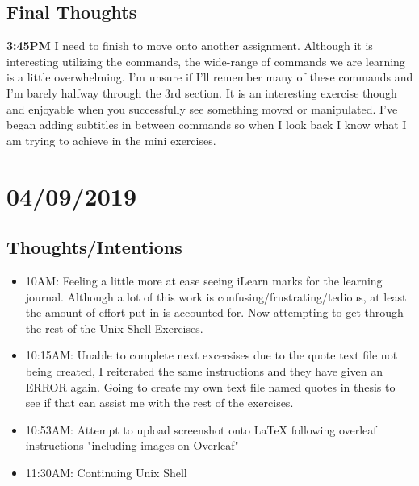 \documentclass{article}
\begin{document}
\subsection{Final Thoughts}
\textbf{3:45PM} I need to finish to move onto another assignment. Although it is interesting utilizing the commands, the wide-range of commands we are learning is a little overwhelming. I'm unsure if I'll remember many of these commands and I'm barely halfway through the 3rd section. It is an interesting exercise though and enjoyable when you successfully see something moved or manipulated. I've began adding subtitles in between commands so when I look back I know what I am trying to achieve in the mini exercises.

\section{04/09/2019}
\subsection{Thoughts/Intentions}
\begin{itemize}
\item 10AM: Feeling a little more at ease seeing iLearn marks for the learning journal. Although a lot of this work is confusing/frustrating/tedious, at least the amount of effort put in is accounted for. Now attempting to get through the rest of the Unix Shell Exercises.
\item 10:15AM: Unable to complete next excersises due to the quote text file not being created, I reiterated the same instructions and they have given an ERROR again. Going to create my own text file named quotes in thesis to see if that can assist me with the rest of the exercises.
\item 10:53AM: Attempt to upload screenshot onto LaTeX following overleaf instructions "including images on Overleaf"
\item 11:30AM: Continuing Unix Shell
\end{itemize}
\end{document}
